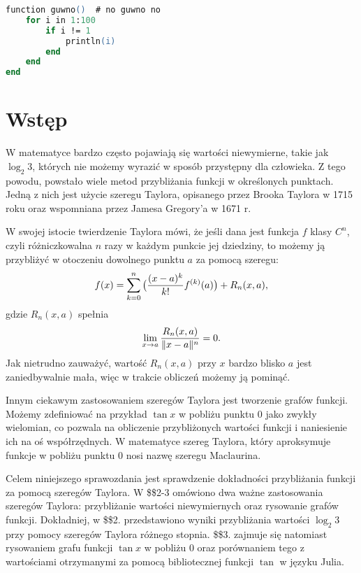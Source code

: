 \documentclass[11pt, wide]{mwart}
\begin{document}
\maketitle
\tableofcontents

\begin{lstlisting}[language=ps]
function guwno()  # no guwno no
    for i in 1:100
        if i != 1
            println(i)
        end
    end
end
\end{lstlisting}

\section{Wstęp}

W matematyce bardzo często pojawiają się wartości niewymierne, takie jak $\log_2 3$, których nie możemy wyrazić w sposób przystępny dla człowieka. Z tego powodu, powstało wiele metod przybliżania funkcji w określonych punktach. Jedną z nich jest użycie szeregu Taylora, opisanego przez Brooka Taylora w 1715 roku oraz wspomniana przez Jamesa Gregory'a w 1671 r.
\medskip

W swojej istocie twierdzenie Taylora mówi, że jeśli dana jest funkcja $f$ klasy $C^n$, czyli różniczkowalna $n$ razy w każdym punkcie jej dziedziny, to możemy ją przybliżyć w otoczeniu dowolnego punktu $a$ za pomocą szeregu:
$$f(x)=\sum\limits_{k=0}^n\big({(x-a)^k\over k!} f^{(k)}(a)\big)+R_n(x, a),$$
gdzie $R_n(x, a)$ spełnia
$$\lim\limits_{x\to a}{R_n(x,a)\over\|x-a\|^n}=0.$$
Jak nietrudno zauważyć, wartość $R_n(x, a)$ przy $x$ bardzo blisko $a$ jest zaniedbywalnie mała, więc w trakcie obliczeń możemy ją pominąć.

Innym ciekawym zastosowaniem szeregów Taylora jest tworzenie grafów funkcji. Możemy zdefiniować na przykład $\tan x$ w pobliżu punktu $0$ jako zwykły wielomian, co pozwala na obliczenie przybliżonych wartości funkcji i naniesienie ich na oś współrzędnych. W matematyce szereg Taylora, który aproksymuje funkcje w pobliżu punktu $0$ nosi nazwę szeregu Maclaurina.

Celem niniejszego sprawozdania jest sprawdzenie dokładności przybliżania funkcji za pomocą szeregów Taylora. W \$\$2-3 omówiono dwa ważne zastosowania szeregów Taylora: przybliżanie wartości niewymiernych oraz rysowanie grafów funkcji. Dokładniej, w \$\$2. przedstawiono wyniki przybliżania wartości $\log_2 3$ przy pomocy szeregów Taylora różnego stopnia. \$\$3. zajmuje się natomiast rysowaniem grafu funkcji $\tan x$ w pobliżu $0$ oraz porównaniem tego z wartościami otrzymanymi za pomocą bibliotecznej funkcji $\tan$ w języku Julia.
\end{document}
